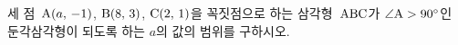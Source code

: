 세 점~$\mathrm{A}(a,\,-1)$, $\mathrm{B}(8,\,3)$, $\mathrm{C}(2,\,1)$을 꼭짓점으로 하는 삼각형~$\mathrm{ABC}$가 $\angle\mathrm{A}>90^\circ$인 둔각삼각형이 되도록 하는 $a$의 값의 범위를 구하시오. 
